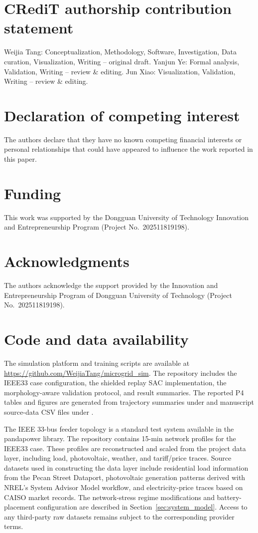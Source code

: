 \section*{CRediT authorship contribution statement}
Weijia Tang: Conceptualization, Methodology, Software, Investigation, Data curation, Visualization, Writing -- original draft.
Yanjun Ye: Formal analysis, Validation, Writing -- review \& editing.
Jun Xiao: Visualization, Validation, Writing -- review \& editing.

\section*{Declaration of competing interest}
The authors declare that they have no known competing financial interests or personal relationships that could have appeared to influence the work reported in this paper.

\section*{Funding}
This work was supported by the Dongguan University of Technology Innovation and Entrepreneurship Program (Project No.~202511819198).

\section*{Acknowledgments}
The authors acknowledge the support provided by the Innovation and Entrepreneurship Program of Dongguan University of Technology (Project No.~202511819198).

\section*{Code and data availability}

The simulation platform and training scripts are available at \url{https://github.com/WeijiaTang/microgrid_sim}. The repository includes the IEEE33 case configuration, the shielded replay SAC implementation, the morphology-aware validation protocol, and result summaries. The reported P4 tables and figures are generated from trajectory summaries under  and manuscript source-data CSV files under .

The IEEE 33-bus feeder topology is a standard test system available in the pandapower library. The repository contains 15-min network profiles for the IEEE33 case. These profiles are reconstructed and scaled from the project data layer, including load, photovoltaic, weather, and tariff/price traces. Source datasets used in constructing the data layer include residential load information from the Pecan Street Dataport, photovoltaic generation patterns derived with NREL's System Advisor Model workflow, and electricity-price traces based on CAISO market records. The network-stress regime modifications and battery-placement configuration are described in Section~\ref{sec:system_model}. Access to any third-party raw datasets remains subject to the corresponding provider terms.
